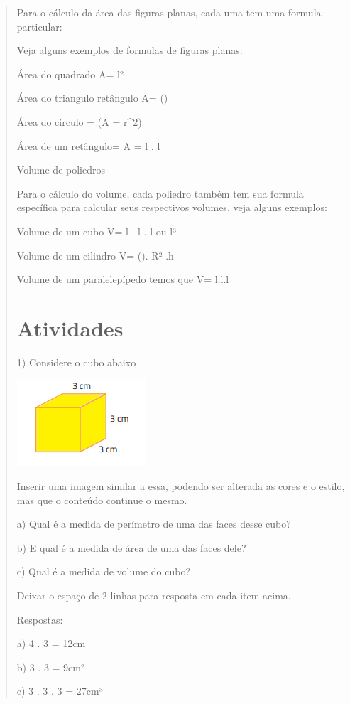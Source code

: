\begin{quote}
\begin{escolha}
Para o cálculo da área das figuras planas, cada uma tem uma formula
particular:

Veja alguns exemplos de formulas de figuras planas:

Área do quadrado A= l²

Área do triangulo retângulo A= ()


Área do circulo = (A = \pi r^{2})

Área de um retângulo= A = l . l

Volume de poliedros

Para o cálculo do volume, cada poliedro também tem sua formula
específica para calcular seus respectivos volumes, veja alguns exemplos:

Volume de um cubo V= l . l . l ou l³

Volume de um cilindro V= (\Pi). R² .h

Volume de um paralelepípedo temos que V= l.l.l

\section{Atividades}

1) Considere o cubo abaixo

\includegraphics[width=1.89583in,height=1.27083in]{./imgSAEB_8_MAT/media/image42.png}

Inserir uma imagem similar a essa, podendo ser alterada as cores e o
estilo, mas que o conteúdo continue o mesmo.

a) Qual é a medida de perímetro de uma das faces desse cubo?

b) E qual é a medida de área de uma das faces dele?

c) Qual é a medida de volume do cubo?

Deixar o espaço de 2 linhas para resposta em cada item acima.

Respostas:

a) 4 . 3 = 12cm

b) 3 . 3 = 9cm²

c) 3 . 3 . 3 = 27cm³


\end{escolha}
\end{quote}
